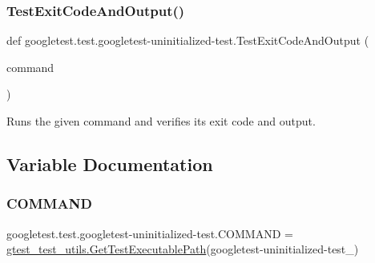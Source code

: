 \subsubsection{\texorpdfstring{TestExitCodeAndOutput()}{TestExitCodeAndOutput()}}
{\footnotesize\ttfamily def googletest.\+test.\+googletest-\/uninitialized-\/test.\+Test\+Exit\+Code\+And\+Output (\begin{DoxyParamCaption}\item[{}]{command }\end{DoxyParamCaption})}

\begin{DoxyVerb}Runs the given command and verifies its exit code and output.\end{DoxyVerb}
 

\subsection{Variable Documentation}
\mbox{\label{namespacegoogletest_1_1test_1_1googletest-uninitialized-test_a40aa089e8c55dbb2c5048c322bd1c5e1}} 
\subsubsection{\texorpdfstring{COMMAND}{COMMAND}}
{\footnotesize\ttfamily googletest.\+test.\+googletest-\/uninitialized-\/test.\+C\+O\+M\+M\+A\+ND = \mbox{\hyperlink{namespacegoogletest_1_1test_1_1gtest__test__utils_ac9af888c702350aac56b154a6af34098}{gtest\+\_\+test\+\_\+utils.\+Get\+Test\+Executable\+Path}}(\textquotesingle{}googletest-\/uninitialized-\/test\+\_\+\textquotesingle{})}


